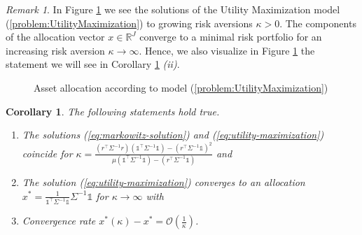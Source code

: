 \documentclass[a4paper, english, 11pt, onecolumn, oneside, final]{article}
\numberwithin{equation}{section}   %
\newcommand{\R}{\mathbb{R}}                 %
\newcommand{\one}{\mathds 1}
\newcommand{\precision}{\Sigma^{-1}}
\newcommand{\A}{r^\top\Sigma^{-1} r}
\newcommand{\B}{r^\top\Sigma^{-1}\one}
\newcommand{\C}{\one^\top\Sigma^{-1}\one}
\newcommand{\D}{(\A)(\C)-(\B)^2}
\theoremstyle{plain}
\newtheorem{corollary}  [theorem]{Corollary}
\theoremstyle{definition}
\theoremstyle{remark}
\newtheorem{remark}     [theorem]{Remark}
\begin{document}
\begin{remark}
    In Figure \ref{fig:AllocationUtilityMaximization} we see the solutions of the Utility Maximization model (\ref{problem:UtilityMaximization}) to growing risk aversions $\kappa>0$. The components of the allocation vector $x\in\R^J$ converge to a minimal risk portfolio for an increasing risk aversion $\kappa\to\infty$. Hence, we also visualize in Figure \ref{fig:AllocationUtilityMaximization} the statement we will see in Corollary \ref{cor:UtilityMaximization} \textit{(ii)}.
\end{remark}
\begin{figure}[h]
  \centering
  
  \caption{Asset allocation according to model (\ref{problem:UtilityMaximization})}
\label{fig:AllocationUtilityMaximization}
\end{figure}\newpage
\begin{corollary}
\label{cor:UtilityMaximization}
    The following statements hold true.
    \begin{enumerate}
        \item The solutions (\ref{eq:markowitz-solution}) and (\ref{eq:utility-maximization}) coincide for $\kappa = \frac{\D}{\mu(\C) - (\B)}$ and
        \item The solution (\ref{eq:utility-maximization}) converges to an allocation $x^*=\frac{1}{\C}\precision\one$ for $\kappa\to\infty$ with
        \item Convergence rate $x^*(\kappa)-x^*=\mathcal{O}(\frac{1}{\kappa})$.
    \end{enumerate}
\end{corollary}
\end{document}
